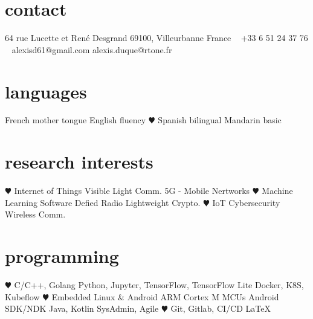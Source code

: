 \documentclass[]{cv-style}          %
\begin{document}
\lastupdated


\begin{aside}
%
\section{contact}
64 rue Lucette et René Desgrand
69100, Villeurbanne
France
~
+33 6 51 24 37 76
~
alexisd61@gmail.com
alexis.duque@rtone.fr
%
\section{languages}
French mother tongue
English fluency
{\color{red} $\varheartsuit$} Spanish bilingual
Mandarin basic
%
\section{research interests}
{\color{red} $\varheartsuit$} Internet of Things
Visible Light Comm.
5G - Mobile Nertworks
{\color{red} $\varheartsuit$} Machine Learning
Software Defied Radio
Lightweight Crypto.
{\color{red} $\varheartsuit$} IoT Cybersecurity
Wireless Comm.
%
\section{programming}
{\color{red} $\varheartsuit$} C/C++, Golang
Python, Jupyter, TensorFlow, TensorFlow Lite
Docker, K8S, Kubeflow
{\color{red} $\varheartsuit$} Embedded Linux \& Android
ARM Cortex M MCUs
Android SDK/NDK
Java, Kotlin
SysAdmin, Agile
{\color{red} $\varheartsuit$} Git, Gitlab, CI/CD
\LaTeX{}
%
\end{aside}




\end{document}
